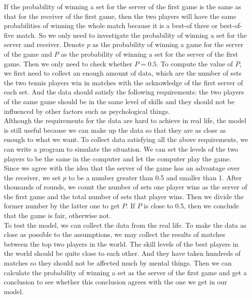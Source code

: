 \documentclass[12pt]{article}
\begin{document}
If the probability of winning a set for the server of the first game is the same as that for the receiver of the first game, then the two players will have the same probabilities of winning the whole match because it is a best-of three or best-of-five match. So we only need to investigate the probability of winning a set for the server and receiver. Denote $p$ as the probability of winning a game for the server of the game and $P$ as the probability of winning a set for the server of the first game. Then we only need to check whether $P=0.5$. To compute the value of $P$, we first need to collect an enough amount of data, which are the number of sets the two tennis players win in matches with the acknowledge of the first server of each set. And the data should satisfy the following requirements: the two players of the same game should be in the same level of skills and they should not be influenced by other factors such as psychological things.\\

Although the requirements for the data are hard to achieve in real life, the model is still useful because we can make up the data so that they are as close as enough to what we want. To collect data satisfying all the above requirements, we can write a program to simulate the situation. We can set the levels of the two players to be the same in the computer and let the computer play the game. Since we agree with the idea that the server of the game has an advantage over the receiver, we set $p$ to be a number greater than 0.5 and smaller than 1. After thousands of rounds, we count the number of sets one player wins as the server of the first game and the total number of sets that player wins. Then we divide the former number by the latter one to get $P$. If $P$ is close to 0.5, then we conclude that the game is fair, otherwise not.\\

To test the model, we can collect the data from the real life. To make the data as close as possible to the assumptions, we may collect the results of matches between the top two players in the world. The skill levels of the best players in the world should be quite close to each other. And they have taken hundreds of matches so they should not be affected much by mental things. Then we can calculate the probability of winning a set as the server of the first game and get a conclusion to see whether this conclusion agrees with the one we get in our model.\\
 
\end{document}

